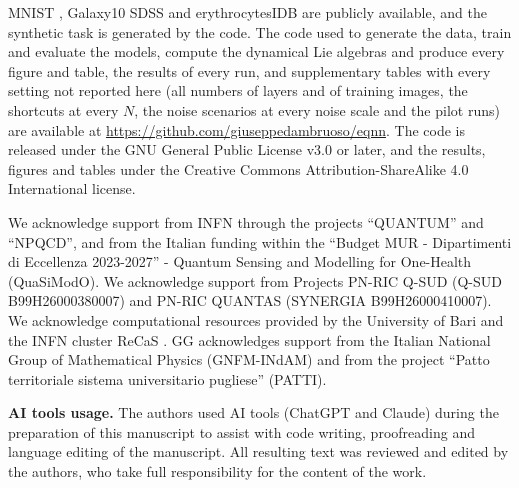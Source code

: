 \documentclass[aps,pra,reprint,superscriptaddress,longbibliography]{revtex4-2}
\begin{document}
MNIST \citep{lecun1998gradient}, Galaxy10 SDSS \citep{galaxy10} and erythrocytesIDB \citep{erythrocytesidb} are publicly available, and the synthetic task is generated by the code. The code used to generate the data, train and evaluate the models, compute the dynamical Lie algebras and produce every figure and table, the results of every run, and supplementary tables with every setting not reported here (all numbers of layers and of training images, the shortcuts at every $N$, the noise scenarios at every noise scale and the pilot runs) are available at \url{https://github.com/giuseppedambruoso/eqnn}. The code is released under the GNU General Public License v3.0 or later, and the results, figures and tables under the Creative Commons Attribution-ShareAlike 4.0 International license.

\begin{acknowledgments}

We acknowledge support from INFN through the projects “QUANTUM” and “NPQCD”, and from the Italian funding within the “Budget MUR - Dipartimenti di Eccellenza 2023-2027” - Quantum
Sensing and Modelling for One-Health (QuaSiModO). We acknowledge support from Projects PN-RIC Q-SUD (Q-SUD B99H26000380007) and PN-RIC QUANTAS (SYNERGIA B99H26000410007).
We acknowledge computational resources provided by the University of Bari and the INFN cluster ReCaS \cite{RECAS}. GG acknowledges support from the Italian National Group of Mathematical Physics (GNFM-INdAM) and from the project “Patto territoriale sistema universitario pugliese” (PATTI). 


\textbf{AI tools usage.}
The authors used AI tools (ChatGPT and Claude) during the preparation
of this manuscript to assist with code writing, proofreading and language editing of the manuscript.
All resulting text was reviewed and edited by the authors, who take full responsibility for
the content of the work.


\end{acknowledgments}
\end{document}
